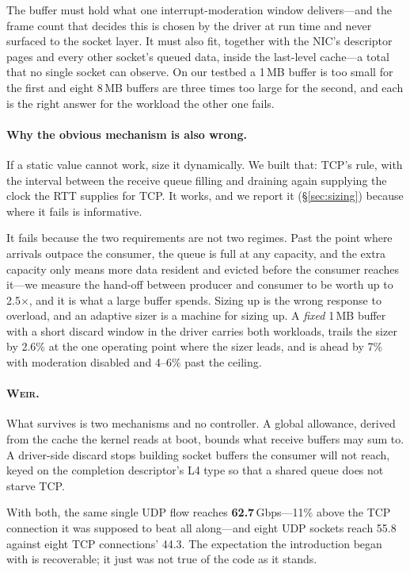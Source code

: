 \documentclass[letterpaper,twocolumn,10pt]{article}
\newcommand{\sys}{\textsc{Weir}\xspace}
\begin{document}
The buffer must hold what one interrupt-moderation window delivers---and the
frame count that decides this is chosen by the driver at run time and never
surfaced to the socket layer. It must also fit, together with the NIC's
descriptor pages and every other socket's queued data, inside the last-level
cache---a total that no single socket can observe. On our testbed a 1\,MB buffer
is too small for the first and eight 8\,MB buffers are three times too large for
the second, and each is the right answer for the workload the other one fails.

\paragraph{Why the obvious mechanism is also wrong.} If a static value cannot
work, size it dynamically. We built that: TCP's rule, with the interval between
the receive queue filling and draining again supplying the clock the RTT
supplies for TCP. It works, and we report it (\S\ref{sec:sizing}) because where
it fails is informative.

It fails because the two requirements are not two regimes. Past the point where
arrivals outpace the consumer, the queue is full at any capacity, and the extra
capacity only means more data resident and evicted before the consumer reaches
it---we measure the hand-off between producer and consumer to be worth up to
2.5$\times$, and it is what a large buffer spends. Sizing up is the wrong
response to overload, and an adaptive sizer is a machine for sizing up. A
\emph{fixed} 1\,MB buffer with a short discard window in the driver carries both
workloads, trails the sizer by 2.6\% at the one operating point where the sizer
leads, and is ahead by 7\% with moderation disabled and 4--6\% past the ceiling.

\paragraph{\sys.} What survives is two mechanisms and no controller. A global
allowance, derived from the cache the kernel reads at boot, bounds what receive
buffers may sum to. A driver-side discard stops building socket buffers the
consumer will not reach, keyed on the completion descriptor's L4 type so that a
shared queue does not starve TCP.

With both, the same single UDP flow reaches \textbf{62.7}\,Gbps---11\% above the
TCP connection it was supposed to beat all along---and eight UDP sockets reach
55.8 against eight TCP connections' 44.3. The expectation the introduction began
with is recoverable; it just was not true of the code as it stands.
\end{document}
